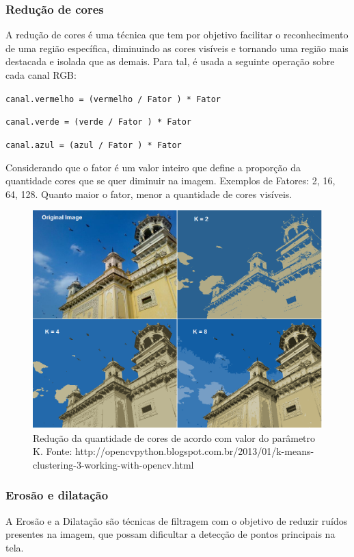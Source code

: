 \documentclass[12pt]{article}
\begin{document}
\subsubsection{Redu\c c\~ao de cores}
A redu\c c\~ao de cores \'e uma t\'ecnica que tem por objetivo facilitar o reconhecimento de uma regi\~ao espec\'ifica,
diminuindo as cores vis\'iveis e tornando uma regi\~ao mais destacada e isolada que as demais.
Para tal, \'e usada a seguinte opera\c c\~ao sobre cada canal RGB:

\texttt{\small canal.vermelho = (vermelho / Fator ) * Fator}

\texttt{\small canal.verde = (verde / Fator ) * Fator}

\texttt{\small canal.azul = (azul / Fator ) * Fator}
\vspace{0.5cm}

\noindent Considerando que o fator \'e um valor inteiro que define a propor\c c\~ao da quantidade cores que se quer diminuir na imagem.
Exemplos de Fatores: 2, 16, 64, 128. Quanto maior o fator, menor a quantidade de cores vis\'iveis.

	\begin{figure}[ht!]
	\begin{center}
		\includegraphics[scale=0.3]{img/kmeansout.png}
		\footnotesize \caption{Redu\c c\~ao da quantidade de cores de acordo com valor do par\^ametro K. Fonte: http://opencvpython.blogspot.com.br/2013/01/k-means-clustering-3-working-with-opencv.html }
	\end{center}
	\end{figure}	

\subsubsection{Eros\~ao e dilata\c c\~ao}
A Eros\~ao e a Dilata\c c\~ao s\~ao t\'ecnicas de filtragem com o objetivo de reduzir ru\'idos presentes na imagem,
que possam dificultar a detec\c c\~ao de pontos principais na tela.
\end{document}
